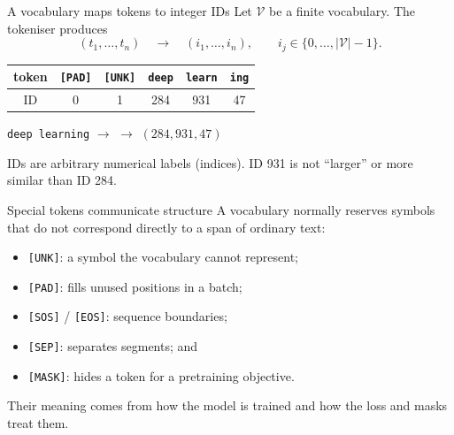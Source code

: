 \begin{frame}{A vocabulary maps tokens to integer IDs}
  Let $\mathcal{V}$ be a finite vocabulary. The tokeniser produces
  \[
    (t_1,\ldots,t_n)
    \quad\longrightarrow\quad
    (i_1,\ldots,i_n),
    \qquad i_j\in\{0,\ldots,|\mathcal{V}|-1\}.
  \]

  \begin{center}
    \begin{tabular}{c|ccccc}
      token & \texttt{[PAD]} & \texttt{[UNK]} & \texttt{deep} &
      \texttt{learn} & \texttt{ing} \\ \hline
      ID & 0 & 1 & 284 & 931 & 47
    \end{tabular}

    \vspace{0.8em}
    \texttt{deep learning}
    $\longrightarrow$
      
    $\longrightarrow$
    $(284,931,47)$
  \end{center}

  IDs are arbitrary numerical labels (indices). ID 931 is not ``larger'' or more similar than ID 284.
\end{frame}

\begin{frame}{Special tokens communicate structure}
  A vocabulary normally reserves symbols that do not correspond directly to a
  span of ordinary text:
  \begin{itemize}
    \item \texttt{[UNK]}: a symbol the vocabulary cannot represent;
    \item \texttt{[PAD]}: fills unused positions in a batch;
    \item \texttt{[SOS]} / \texttt{[EOS]}: sequence boundaries;
    \item \texttt{[SEP]}: separates segments; and
    \item \texttt{[MASK]}: hides a token for a pretraining objective.
  \end{itemize}

  Their meaning comes from how the model is trained and how the loss and masks
  treat them.
\end{frame}


